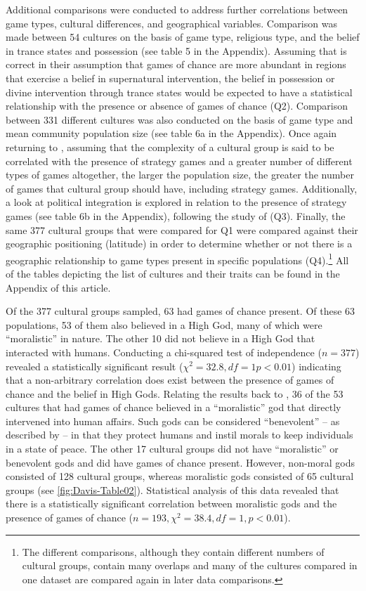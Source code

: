 \documentclass[%
	]{ijsra}
\begin{document}
Additional comparisons were conducted to address further correlations between game types, cultural differences, and geographical variables. Comparison was made between 54 cultures on the basis of game type, religious type, and the belief in trance states and possession (see table 5 in the Appendix). Assuming that \textcite{roberts1959} is correct in their assumption that games of chance are more abundant in regions that exercise a belief in supernatural intervention, the belief in possession or divine intervention through trance states would be expected to have a statistical relationship with the presence or absence of games of chance (Q2). Comparison between 331 different cultures was also conducted on the basis of game type and mean community population size (see table 6a in the Appendix). Once again returning to \textcite{roberts1959}, assuming that the complexity of a cultural group is said to be correlated with the presence of strategy games and a greater number of different types of games altogether, the larger the population size, the greater the number of games that cultural group should have, including strategy games. Additionally, a look at political integration is explored in relation to the presence of strategy games (see table 6b in the Appendix), 
following the study of \textcite{roberts1959} (Q3). Finally, the same 377 cultural groups that were compared for Q1 were compared against their geographic positioning (latitude) in order to determine whether or not there is a geographic relationship to game types present in specific populations (Q4).\footnote{The different comparisons, although they contain different numbers of cultural groups, contain many overlaps and many of the cultures compared in one dataset are compared again in later data comparisons.} All of the tables depicting the list of cultures and their traits can be found in the Appendix of this article.

Of the 377 cultural groups sampled, 63 had games of chance present. Of these 63 populations, 53 of them also believed in a High God, many of which were ``moralistic” in nature. %
The other 10 did not believe in a High God that interacted with humans. Conducting a chi-squared test of independence ($n = 377$) revealed a statistically significant result ($\chi^{2} = 32.8, df = 1 p < 0.01$) indicating that a non-arbitrary correlation does exist between the presence of games of chance and the belief in High Gods. Relating the results back to \textcite{roberts1959}, 36 of the 53 cultures that had games of chance believed in a ``moralistic” god that directly intervened into human affairs. Such gods can be considered ``benevolent” – as described by \textcite{lambert1959} – in that they protect humans and instil morals to keep individuals in a state of peace. The other 17 cultural groups did not have ``moralistic” or benevolent gods and did have games of chance present. However, non-moral gods consisted of 128 cultural groups, whereas moralistic gods consisted of 65 cultural groups (see \cref{fig:Davis-Table02}). Statistical analysis of this data revealed that there is a statistically significant correlation between moralistic gods and the presence of games of chance ($n = 193, \chi^{2} = 38.4, df = 1, p < 0.01$).
\end{document}
